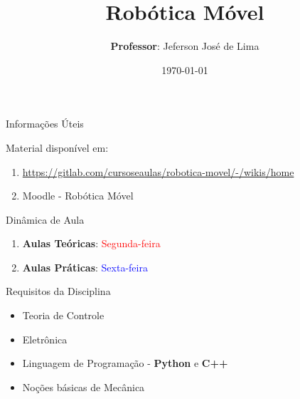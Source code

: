 \documentclass{beamer}
\title{Robótica Móvel}
\date{\today}
\author[Jeferson José de Lima]{
  \textbf{Professor}: Jeferson José de Lima}
\institute[UTFPR-PB]{Departamento de Informática (DAINF)}
\begin{document}
\maketitle

\begin{frame}{Informações Úteis}
	\begin{block}{Material disponível em:}
		\begin{enumerate}
			\item \href{Robótica Móvel - Wiki}{https://gitlab.com/cursoseaulas/robotica-movel/-/wikis/home}
			\item Moodle - Robótica Móvel
		\end{enumerate}
	\end{block}
	\begin{block}{Dinâmica de Aula}
		\begin{enumerate}
			\item \textbf{Aulas Teóricas}: \textcolor{red}{Segunda-feira}
			\item \textbf{Aulas Práticas}: \textcolor{blue}{Sexta-feira}
		\end{enumerate}
	\end{block}
	\begin{block}{Requisitos da Disciplina}
		\begin{itemize}
		\item Teoria de Controle
		\item Eletrônica
		\item Linguagem de Programação - \textbf{Python} e \textbf{C++}
		\item Noções básicas de Mecânica
		\end{itemize}
	\end{block}
\end{frame}
\end{document}
